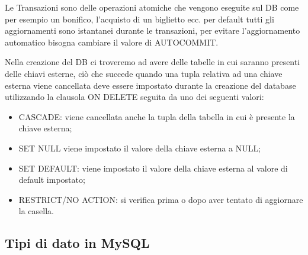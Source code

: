 Le Transazioni sono delle operazioni  atomiche che vengono eseguite sul DB come per esempio un bonifico, l’acquisto di un biglietto ecc. per default tutti gli aggiornamenti sono istantanei durante le transazioni, per evitare l’aggiornamento automatico bisogna cambiare il valore di AUTOCOMMIT. 

Nella creazione del DB ci troveremo ad avere delle tabelle in cui saranno presenti delle chiavi esterne, ciò che succede quando una tupla relativa ad una chiave esterna viene cancellata deve essere impostato durante la creazione del database utilizzando la clausola ON DELETE seguita da uno dei seguenti valori: 

\begin{itemize}

\item{CASCADE}: viene cancellata anche la tupla della tabella in cui è presente la chiave esterna;
\item{SET NULL} viene impostato il valore della chiave esterna a NULL;
\item{SET DEFAULT}: viene impostato il valore della chiave esterna al valore di default impostato;
\item{RESTRICT/NO ACTION}: si verifica prima o dopo aver tentato di aggiornare la casella.

\end{itemize}

\subsection{Tipi di dato in MySQL}

